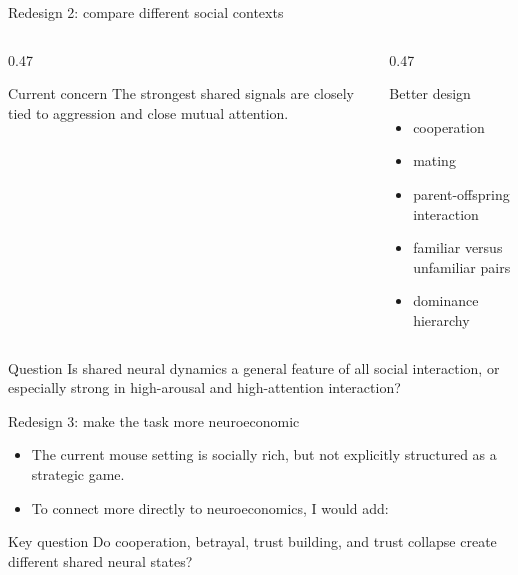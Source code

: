 \documentclass[aspectratio=169,11pt]{beamer}
\begin{document}
\begin{frame}{Redesign 2: compare different social contexts}
\begin{columns}[T]
  \begin{column}{0.47\textwidth}
    \begin{block}{Current concern}
    The strongest shared signals are closely tied to aggression and close mutual attention.
    \end{block}
  \end{column}
  \begin{column}{0.47\textwidth}
    \begin{block}{Better design}
    \begin{itemize}
      \item cooperation
      \item mating
      \item parent-offspring interaction
      \item familiar versus unfamiliar pairs
      \item dominance hierarchy
    \end{itemize}
    \end{block}
  \end{column}
\end{columns}
\vspace{0.4em}
\begin{alertblock}{Question}
Is shared neural dynamics a general feature of all social interaction, or especially strong in high-arousal and high-attention interaction?
\end{alertblock}
\end{frame}

\begin{frame}{Redesign 3: make the task more neuroeconomic}
\begin{itemize}
  \item The current mouse setting is socially rich, but not explicitly structured as a strategic game.
  \item To connect more directly to neuroeconomics, I would add:
\end{itemize}
\begin{center}
\end{center}
\vspace{0.3em}
\begin{block}{Key question}
Do cooperation, betrayal, trust building, and trust collapse create different shared neural states?
\end{block}
\end{frame}
\end{document}

